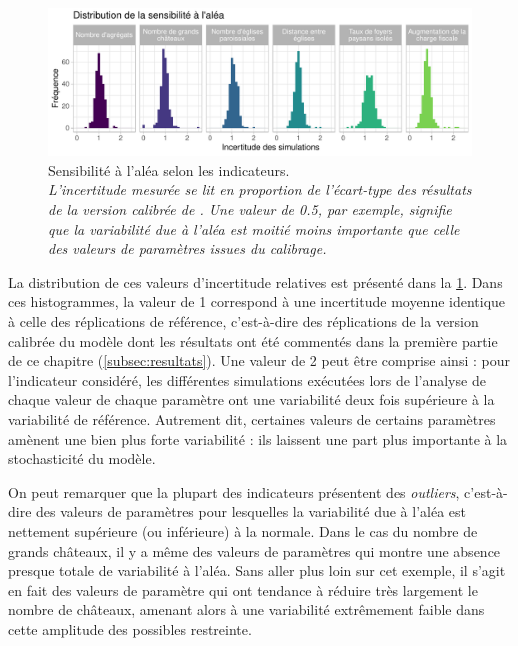 \begin{figure}[H]
	\centering
	\includegraphics[width=\linewidth]{img/histo_sensibilite_alea.pdf}
	\caption[Sensibilité à l'aléa selon les indicateurs.]{Sensibilité à l'aléa selon les indicateurs.\\
	{\small
	\textit{L'incertitude mesurée se lit en proportion de l'écart-type des résultats de la version calibrée de \simfeodal{}.
	Une valeur de 0.5, par exemple, signifie que la variabilité due à l'aléa est moitié moins importante	que celle des valeurs de paramètres issues du calibrage.}}}
	\label{fig:histo-sensib-alea}
\end{figure}

La distribution de ces valeurs d'incertitude relatives est présenté dans la \cref{fig:histo-sensib-alea}.
Dans ces histogrammes, la valeur de 1 correspond à une incertitude moyenne identique à celle des réplications de référence, c'est-à-dire des réplications de la version calibrée du modèle dont les résultats ont été commentés dans la première partie de ce chapitre (\cref{subsec:resultats}).
Une valeur de 2 peut être comprise ainsi : pour l'indicateur considéré, les différentes simulations exécutées lors de l'analyse de chaque valeur de chaque paramètre ont une variabilité deux fois supérieure à la variabilité de référence.
Autrement dit, certaines valeurs de certains paramètres amènent une bien plus forte variabilité : ils laissent une part plus importante à la stochasticité du modèle.

On peut remarquer que la plupart des indicateurs présentent des \textit{outliers}, c'est-à-dire des valeurs de paramètres pour lesquelles la variabilité due à l'aléa est nettement supérieure (ou inférieure) à la normale.
Dans le cas du nombre de grands châteaux, il y a même des valeurs de paramètres qui montre une absence presque totale de variabilité à l'aléa.
Sans aller plus loin sur cet exemple, il s'agit en fait des valeurs de paramètre qui ont tendance à réduire très largement le nombre de châteaux, amenant alors à une variabilité extrêmement faible dans cette amplitude des possibles restreinte.

